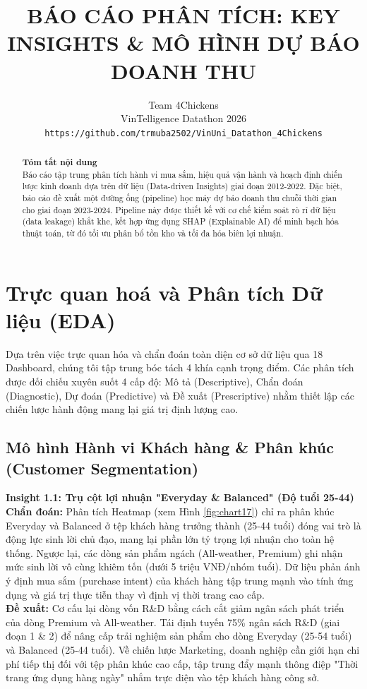 \documentclass{article}
\title{BÁO CÁO PHÂN TÍCH: KEY INSIGHTS \& MÔ HÌNH DỰ BÁO DOANH THU}
\author{%
  Team 4Chickens \\
  VinTelligence Datathon 2026 \\
  \texttt{https://github.com/trmuba2502/VinUni_Datathon_4Chickens} \\
}
\begin{document}
\maketitle

\begin{abstract}
  \textbf{Tóm tắt nội dung}\\
  Báo cáo tập trung phân tích hành vi mua sắm, hiệu quả vận hành và hoạch định chiến lược kinh doanh dựa trên dữ liệu (Data-driven Insights) giai đoạn 2012-2022. Đặc biệt, báo cáo đề xuất một đường ống (pipeline) học máy dự báo doanh thu chuỗi thời gian cho giai đoạn 2023-2024. Pipeline này được thiết kế với cơ chế kiểm soát rò rỉ dữ liệu (data leakage) khắt khe, kết hợp ứng dụng SHAP (Explainable AI) để minh bạch hóa thuật toán, từ đó tối ưu phân bổ tồn kho và tối đa hóa biên lợi nhuận.
\end{abstract}

\section{Trực quan hoá và Phân tích Dữ liệu (EDA)}

Dựa trên việc trực quan hóa và chẩn đoán toàn diện cơ sở dữ liệu qua 18 Dashboard, chúng tôi tập trung bóc tách 4 khía cạnh trọng điểm. Các phân tích được đối chiếu xuyên suốt 4 cấp độ: Mô tả (Descriptive), Chẩn đoán (Diagnostic), Dự đoán (Predictive) và Đề xuất (Prescriptive) nhằm thiết lập các chiến lược hành động mang lại giá trị định lượng cao.

\subsection{Mô hình Hành vi Khách hàng \& Phân khúc (Customer Segmentation)}

\textbf{Insight 1.1: Trụ cột lợi nhuận "Everyday \& Balanced" (Độ tuổi 25-44)} \\
\textbf{Chẩn đoán:} Phân tích Heatmap (xem Hình \ref{fig:chart17}) chỉ ra phân khúc Everyday và Balanced ở tệp khách hàng trưởng thành (25-44 tuổi) đóng vai trò là động lực sinh lời chủ đạo, mang lại phần lớn tỷ trọng lợi nhuận cho toàn hệ thống. Ngược lại, các dòng sản phẩm ngách (All-weather, Premium) ghi nhận mức sinh lời vô cùng khiêm tốn (dưới 5 triệu VNĐ/nhóm tuổi). Dữ liệu phản ánh ý định mua sắm (purchase intent) của khách hàng tập trung mạnh vào tính ứng dụng và giá trị thực tiễn thay vì định vị thời trang cao cấp.
\\
\textbf{Đề xuất:} Cơ cấu lại dòng vốn R\&D bằng cách cắt giảm ngân sách phát triển của dòng Premium và All-weather. Tái định tuyến 75\% ngân sách R\&D (giai đoạn 1 \& 2) để nâng cấp trải nghiệm sản phẩm cho dòng Everyday (25-54 tuổi) và Balanced (25-44 tuổi). Về chiến lược Marketing, doanh nghiệp cần giới hạn chi phí tiếp thị đối với tệp phân khúc cao cấp, tập trung đẩy mạnh thông điệp "Thời trang ứng dụng hàng ngày" nhắm trực diện vào tệp khách hàng công sở.
\end{document}
